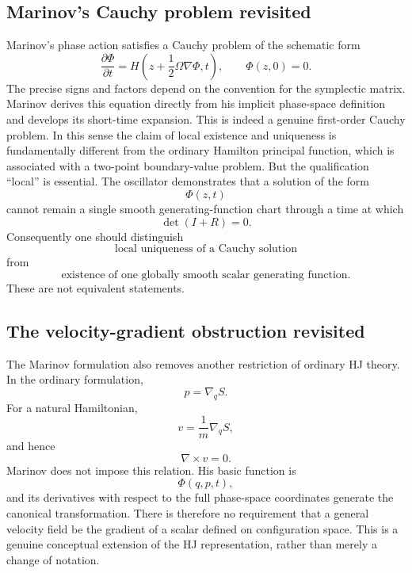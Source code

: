 \subsection{Marinov's Cauchy problem revisited}
Marinov's phase action satisfies a Cauchy problem of the schematic form
\begin{equation}
 \frac{\partial\Phi}{\partial t}
 =
 H\left(
 z+\frac12\Omega\nabla\Phi,t
 \right),
 \qquad
 \Phi(z,0)=0.
 \label{MarinovHJ}
\end{equation}
The precise signs and factors depend on the convention for the symplectic
matrix.  Marinov derives this equation directly from his implicit phase-space
definition and develops its short-time expansion. \cite{Marinov1979}
This is indeed a genuine first-order Cauchy problem.  In this sense the
claim of local existence and uniqueness is fundamentally different from the
ordinary Hamilton principal function, which is associated with a two-point
boundary-value problem.
But the qualification ``local'' is essential.
The oscillator demonstrates that a solution of the form
\begin{equation}
 \Phi(z,t)
\end{equation}
cannot remain a single smooth generating-function chart through a time at
which
\begin{equation}
 \det(I+R)=0.
\end{equation}
Consequently one should distinguish
\begin{equation}
 \boxed{
 \text{local uniqueness of a Cauchy solution}
 }
\end{equation}
from
\begin{equation}
 \boxed{
 \text{existence of one globally smooth scalar generating function}.
 }
\end{equation}
These are not equivalent statements.
\subsection{The velocity-gradient obstruction revisited}
The Marinov formulation also removes another restriction of ordinary HJ
theory.
In the ordinary formulation,
\begin{equation}
 p=\nabla_q S.
\end{equation}
For a natural Hamiltonian,
\begin{equation}
 v=\frac{1}{m}\nabla_qS,
\end{equation}
and hence
\begin{equation}
 \nabla\times v=0.
\end{equation}
Marinov does not impose this relation.  His basic function is
\begin{equation}
 \Phi(q,p,t),
\end{equation}
and its derivatives with respect to the full phase-space coordinates generate
the canonical transformation.  There is therefore no requirement that a
general velocity field be the gradient of a scalar defined on configuration
space.
This is a genuine conceptual extension of the HJ representation, rather than
merely a change of notation.
